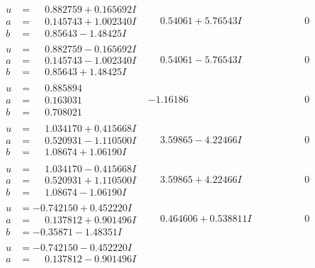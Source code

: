 \documentclass[1p]{elsarticle_modified}
\theoremstyle{definition}
\begin{document}
$$\begin{array}{c|c|c}
\begin{aligned}
u &= \phantom{-}0.882759 + 0.165692 I \\
a &= \phantom{-}0.145743 + 1.002340 I \\
b &= \phantom{-}0.85643 - 1.48425 I\end{aligned}
 & \phantom{-}0.54061 + 5.76543 I & \phantom{-0.000000 } 0 \\ \hline\begin{aligned}
u &= \phantom{-}0.882759 - 0.165692 I \\
a &= \phantom{-}0.145743 - 1.002340 I \\
b &= \phantom{-}0.85643 + 1.48425 I\end{aligned}
 & \phantom{-}0.54061 - 5.76543 I & \phantom{-0.000000 } 0 \\ \hline\begin{aligned}
u &= \phantom{-}0.885894\phantom{ +0.000000I} \\
a &= \phantom{-}0.163031\phantom{ +0.000000I} \\
b &= \phantom{-}0.708021\phantom{ +0.000000I}\end{aligned}
 & -1.16186\phantom{ +0.000000I} & \phantom{-0.000000 } 0 \\ \hline\begin{aligned}
u &= \phantom{-}1.034170 + 0.415668 I \\
a &= \phantom{-}0.520931 - 1.110500 I \\
b &= \phantom{-}1.08674 + 1.06190 I\end{aligned}
 & \phantom{-}3.59865 - 4.22466 I & \phantom{-0.000000 } 0 \\ \hline\begin{aligned}
u &= \phantom{-}1.034170 - 0.415668 I \\
a &= \phantom{-}0.520931 + 1.110500 I \\
b &= \phantom{-}1.08674 - 1.06190 I\end{aligned}
 & \phantom{-}3.59865 + 4.22466 I & \phantom{-0.000000 } 0 \\ \hline\begin{aligned}
u &= -0.742150 + 0.452220 I \\
a &= \phantom{-}0.137812 + 0.901496 I \\
b &= -0.35871 - 1.48351 I\end{aligned}
 & \phantom{-}0.464606 + 0.538811 I & \phantom{-0.000000 } 0 \\ \hline\begin{aligned}
u &= -0.742150 - 0.452220 I \\
a &= \phantom{-}0.137812 - 0.901496 I \\

\end{aligned}
\end{array}$$
\end{document}
